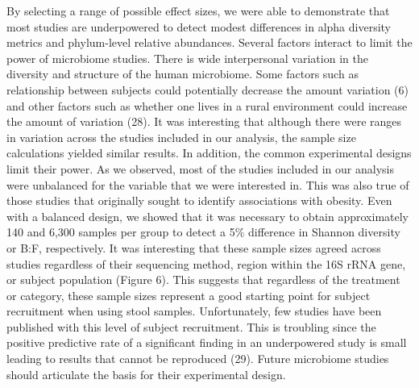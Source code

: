 \documentclass[12pt,]{article}
\begin{document}
By selecting a range of possible effect sizes, we were able to
demonstrate that most studies are underpowered to detect modest
differences in alpha diversity metrics and phylum-level relative
abundances. Several factors interact to limit the power of microbiome
studies. There is wide interpersonal variation in the diversity and
structure of the human microbiome. Some factors such as relationship
between subjects could potentially decrease the amount variation (6) and
other factors such as whether one lives in a rural environment could
increase the amount of variation (28). It was interesting that although
there were ranges in variation across the studies included in our
analysis, the sample size calculations yielded similar results. In
addition, the common experimental designs limit their power. As we
observed, most of the studies included in our analysis were unbalanced
for the variable that we were interested in. This was also true of those
studies that originally sought to identify associations with obesity.
Even with a balanced design, we showed that it was necessary to obtain
approximately 140 and 6,300 samples per group to detect a 5\% difference
in Shannon diversity or B:F, respectively. It was interesting that these
sample sizes agreed across studies regardless of their sequencing
method, region within the 16S rRNA gene, or subject population (Figure
6). This suggests that regardless of the treatment or category, these
sample sizes represent a good starting point for subject recruitment
when using stool samples. Unfortunately, few studies have been published
with this level of subject recruitment. This is troubling since the
positive predictive rate of a significant finding in an underpowered
study is small leading to results that cannot be reproduced (29). Future
microbiome studies should articulate the basis for their experimental
design.
\end{document}
